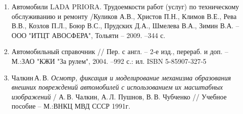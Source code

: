 \begin{enumerate}
%
%
%
%
%
%
%
%
\item 
Автомобили LADA PRIORA. Трудоемкости работ (услуг) по техническому обслуживанию и ремонту /Куликов А.В., Христов П.Н., Климов В.Е., Рева В.В., Козлов П.Л., Боюр В.С., Прудских Д.А., Шмелева В.А., Зимин В.А. -- ООО "ИТЦТ АВОСФЕРА", Тольяти -- 2009. --344 с.
\item
Автомобильный справочник //  Пер. с англ.  -- 2-е изд., перераб. и доп. --М.:ЗАО "КЖИ "За рулем", 2004. --992 с.: ил.  ISBN 5-85907-327-5
%
%
\item
Чалкин\,А.\,В.  \emph{Осмотр, фиксация и моделирование механизма образования внешних повреждений автомобилей с использованием их масштабных изображений} / А.\,В. Чалкин, А.\,Л. Пушнов, В.\,В. Чубченко // Учебное пособие -- М.:ВНКЦ МВД СССР 1991г.
%
%
%


\end{enumerate}

